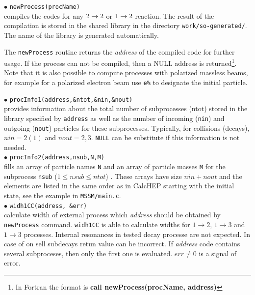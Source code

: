 \documentclass[12pt,a4paper]{article}
\begin{document}
\noindent
$\bullet$ \verb|newProcess(procName)|\\
compiles the  codes for any $2\rightarrow 2$ or  $1\rightarrow 2$  reaction.
The result of the compilation is stored in the  shared library  in the directory \verb|work/so-generated/|. The name of the library is generated
automatically.

The \verb|newProcess| routine returns the
{\it address} of the compiled code for further usage.   If the
process can not be compiled, then a NULL address is
returned\footnote{ In Fortran the  format is
{\bf call  newProcess(procName, address)}  }.
Note that it is also possible to compute processes with polarized massless beams, 
for example for a polarized electron beam use \verb|e%| to designate the initial
particle.




\noindent
$\bullet$ \verb|procInfo1(address,&ntot,&nin,&nout)|\\
provides information  about the total number of subprocesses
(ntot) stored in the library  specified by {\tt address} as well
as the number of incoming (\verb|nin|) and outgoing (\verb|nout|) particles for
these subprocesses. Typically, for collisions (decays), $nin=2(1)$ and $nout=2,3$.
\verb|NULL| can be substitute if this information is not needed. \\
$\bullet$ \verb|procInfo2(address,nsub,N,M)|\\
fills an array of
particle names \verb|N| and an array of particle  masses \verb|M| for the subprocess \verb|nsub| ($1\leq nsub \leq ntot$) . These
arrays have size $nin+nout$ and the elements are listed in the same order
as in CalcHEP starting with the initial state, see the example in 
\verb|MSSM/main.c|.\\

$\bullet$ \verb|widh1CC(address, &err)|\\
calculate width of external process which {\it address} should be obtained
by {\tt newProcess} command. {\tt widh1CC} is able to calculate widths for   $1\to2$,
$1\to3$ and $1\to3$ processes. Internal resonances in  tested decay
processe are not expected. In case of on sell subdecays retun value  can be
incorrect. If {\it address} code contains several  subproceses, then
only the first one is evaluated.  $err \ne 0$ is a signal of error. 
\end{document}
